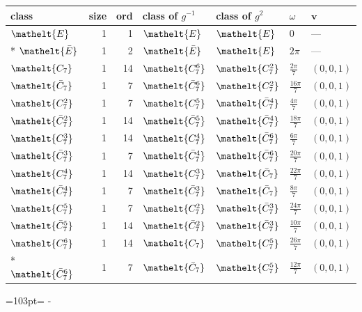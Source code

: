 \documentclass[10pt,a4paper]{article}
\newcommand{\needspace}[1]{\par\penalty-100\begingroup\dimen0=#1\relax\dimen2=\pagegoal
  \advance\dimen2-\pagetotal\ifdim\dimen0>\dimen2\relax\ifdim\dimen2>0pt\vfil\break\fi\fi
  \endgroup}
\numberwithin{equation}{section}
\newcommand{\eltfont}[1]{{\let\sigma\eltsigma\mathelt{#1}}}
\newcommand{\cls}[1]{\eltfont{#1}}
\newcommand{\dirvec}[3]{(#1, #2, #3)}
\newcommand{\vv}{\mathbf{v}}
\newcommand{\barred}[1]{\bar{#1}}
\begin{document}
{\renewcommand{\arraystretch}{1.3}\begin{longtable}{@{}lrrllll@{}}\toprule
class & size & ord & class of $g^{-1}$ & class of $g^{2}$ & $\omega$ & $\vv$\\\midrule\endhead
\bottomrule\endfoot\endlastfoot
$\cls{E}$ & 1 & 1 & $\cls{E}$ & $\cls{E}$ & $0$ & ---\\*
$\cls{\barred{E}}$ & 1 & 2 & $\cls{\barred{E}}$ & $\cls{E}$ & $2\pi$ & ---\\
$\cls{C_{7}}$ & 1 & 14 & $\cls{C_{7}^{6}}$ & $\cls{C_{7}^{2}}$ & $\tfrac{2\pi}{7}$ & $\dirvec{0}{0}{1}$\\
$\cls{\barred{C}_{7}}$ & 1 & 7 & $\cls{\barred{C}_{7}^{6}}$ & $\cls{C_{7}^{2}}$ & $\tfrac{16\pi}{7}$ & $\dirvec{0}{0}{1}$\\
$\cls{C_{7}^{2}}$ & 1 & 7 & $\cls{C_{7}^{5}}$ & $\cls{\barred{C}_{7}^{4}}$ & $\tfrac{4\pi}{7}$ & $\dirvec{0}{0}{1}$\\
$\cls{\barred{C}_{7}^{2}}$ & 1 & 14 & $\cls{\barred{C}_{7}^{5}}$ & $\cls{\barred{C}_{7}^{4}}$ & $\tfrac{18\pi}{7}$ & $\dirvec{0}{0}{1}$\\
$\cls{C_{7}^{3}}$ & 1 & 14 & $\cls{C_{7}^{4}}$ & $\cls{\barred{C}_{7}^{6}}$ & $\tfrac{6\pi}{7}$ & $\dirvec{0}{0}{1}$\\
$\cls{\barred{C}_{7}^{3}}$ & 1 & 7 & $\cls{\barred{C}_{7}^{4}}$ & $\cls{\barred{C}_{7}^{6}}$ & $\tfrac{20\pi}{7}$ & $\dirvec{0}{0}{1}$\\
$\cls{C_{7}^{4}}$ & 1 & 14 & $\cls{C_{7}^{3}}$ & $\cls{\barred{C}_{7}}$ & $\tfrac{22\pi}{7}$ & $\dirvec{0}{0}{1}$\\
$\cls{\barred{C}_{7}^{4}}$ & 1 & 7 & $\cls{\barred{C}_{7}^{3}}$ & $\cls{\barred{C}_{7}}$ & $\tfrac{8\pi}{7}$ & $\dirvec{0}{0}{1}$\\
$\cls{C_{7}^{5}}$ & 1 & 7 & $\cls{C_{7}^{2}}$ & $\cls{\barred{C}_{7}^{3}}$ & $\tfrac{24\pi}{7}$ & $\dirvec{0}{0}{1}$\\
$\cls{\barred{C}_{7}^{5}}$ & 1 & 14 & $\cls{\barred{C}_{7}^{2}}$ & $\cls{\barred{C}_{7}^{3}}$ & $\tfrac{10\pi}{7}$ & $\dirvec{0}{0}{1}$\\
$\cls{C_{7}^{6}}$ & 1 & 14 & $\cls{C_{7}}$ & $\cls{C_{7}^{5}}$ & $\tfrac{26\pi}{7}$ & $\dirvec{0}{0}{1}$\\*
$\cls{\barred{C}_{7}^{6}}$ & 1 & 7 & $\cls{\barred{C}_{7}}$ & $\cls{C_{7}^{5}}$ & $\tfrac{12\pi}{7}$ & $\dirvec{0}{0}{1}$\\
\bottomrule\end{longtable}}
\needspace{103pt}
\end{document}
